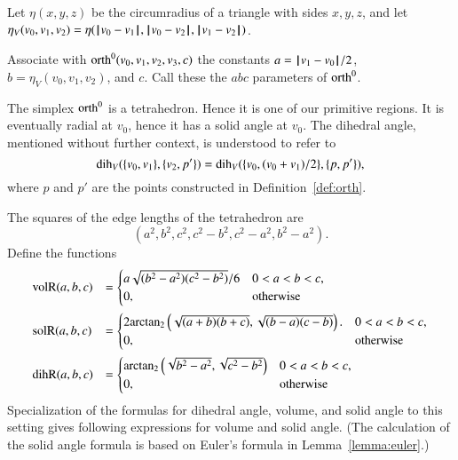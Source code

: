 \begin{definition}\label{def:etaV}
Let $\eta(x,y,z)$ be the circumradius of a triangle with sides
$x,y,z$, and let $\eta_V(v_0,v_1,v_2) = \eta({\hskip0.1em|\hskip-0.15em|\hskip0.1em}v_0 - v_1{\hskip0.1em|\hskip-0.15em|\hskip0.1em},{\hskip0.1em|\hskip-0.15em|\hskip0.1em}v_0 - v_2{\hskip0.1em|\hskip-0.15em|\hskip0.1em},{\hskip0.1em|\hskip-0.15em|\hskip0.1em}v_1 - v_2{\hskip0.1em|\hskip-0.15em|\hskip0.1em})$.
%
%
%
\end{definition}

\begin{definition}
Associate with ${\operatorname{orth}}^0(v_0,v_1,v_2,v_3,c)$ the constants
$a={\hskip0.1em|\hskip-0.15em|\hskip0.1em}v_1 - v_0{\hskip0.1em|\hskip-0.15em|\hskip0.1em}/2$, $b=\eta_V(v_0,v_1,v_2)$, and $c$.
Call these the $abc$ parameters of ${\operatorname{orth}}^0$.
%
%
%
\end{definition}

The simplex ${\operatorname{orth}}^0$ is a tetrahedron.  Hence it is one of our
primitive regions.  It is eventually radial at $v_0$, hence
it has a solid angle at $v_0$.  The dihedral
angle, mentioned without further context, is understood to refer to 
   $$
   \operatorname{dih}_V(\{v_0,v_1\},\{v_2,p'\})=\operatorname{dih}_V(\{v_0,(v_0+v_1)/2\},\{p,p'\}),
   $$
%
where $p$ and $p'$ are the points 
constructed in Definition~\ref{def:orth}.

The squares of the edge lengths of the tetrahedron are
   $$
   (a^2,b^2,c^2,c^2-b^2,c^2-a^2,b^2-a^2).
   $$
Define the functions
   $$
   \begin{array}{lll}
     \op{volR}(a,b,c) &= \begin{cases}
       a\sqrt{(b^2-a^2)(c^2-b^2)}/6& 0 < a < b < c,\\
       0,&\text{otherwise}
       \end{cases}\vspace{6pt}\\
     \op{solR}(a,b,c) &= \begin{cases}
      2 \atn\left(\sqrt{{(a+b)(b+c)}},
         \sqrt{{(b-a) (c-b)}}\right).& 0 < a < b < c,\\
      0,&\text{otherwise}
     \end{cases} \vspace{6pt}\\
     \op{dihR}(a,b,c) &= \begin{cases}
      \atn\left(\sqrt{b^2 - a^2},\sqrt{c^2 - b^2}\right)
      & 0 < a < b < c,\\
      0,&\text{otherwise}
     \end{cases}
     \end{array}
   $$
%
%
%
Specialization of the formulas for dihedral angle, volume, and solid angle to this
setting gives following expressions for volume and solid angle.
(The calculation of the
 solid angle formula is based on Euler's formula in 
Lemma~\ref{lemma:euler}.)

